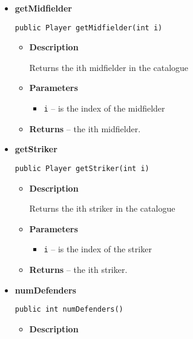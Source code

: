 \documentclass[11pt,a4paper]{report}
\begin{document}
{{{{{{{\begin{itemize}
{\begin{itemize}
{Returns the ith goalkeeper in the catalogue
}
\item{
{\bf  Parameters}
  \begin{itemize}
   \item{
\texttt{i} -- is the index of the goalkeeper}
  \end{itemize}
}%
\item{{\bf  Returns} -- 
the ith goalkeeper. 
}%
\end{itemize}
}%
\item{ 
{\bf  getMidfielder}\\
\begin{lstlisting}[frame=none]
public Player getMidfielder(int i)\end{lstlisting} %
\begin{itemize}
\item{
{\bf  Description}

Returns the ith midfielder in the catalogue
}
\item{
{\bf  Parameters}
  \begin{itemize}
   \item{
\texttt{i} -- is the index of the midfielder}
  \end{itemize}
}%
\item{{\bf  Returns} -- 
the ith midfielder. 
}%
\end{itemize}
}%
\item{ 
{\bf  getStriker}\\
\begin{lstlisting}[frame=none]
public Player getStriker(int i)\end{lstlisting} %
\begin{itemize}
\item{
{\bf  Description}

Returns the ith striker in the catalogue
}
\item{
{\bf  Parameters}
  \begin{itemize}
   \item{
\texttt{i} -- is the index of the striker}
  \end{itemize}
}%
\item{{\bf  Returns} -- 
the ith striker. 
}%
\end{itemize}
}%
\item{ 
{\bf  numDefenders}\\
\begin{lstlisting}[frame=none]
public int numDefenders()\end{lstlisting} %
\begin{itemize}
\item{
{\bf  Description}

}
\end{itemize}}
\end{itemize}}}}}}}}
\end{document}
